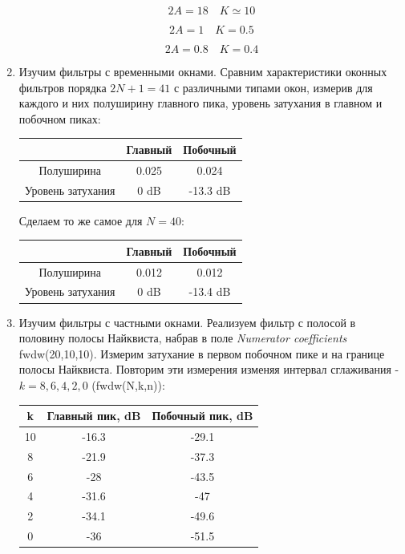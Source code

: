 \documentclass[a4paper, 12pt]{article}%
\begin{document}
\begin{enumerate}
\[2A = 18 \quad K \simeq 10\]

\[2A = 1 \quad K = 0.5\]

\[2A = 0.8 \quad K = 0.4\]

\item Изучим фильтры с временными окнами. Сравним характеристики оконных фильтров порядка $2N + 1 = 41$ с различными типами окон, измерив для каждого и них полуширину главного пика, уровень затухания в главном и побочном пиках:

\begin{center}
\begin{tabular}{|c|c|c|}
\hline 
 & Главный & Побочный \\ 
\hline 
Полуширина & 0.025 & 0.024 \\ 
\hline 
Уровень затухания & 0 dB & -13.3 dB \\ 
\hline 
\end{tabular} 
\end{center}

Сделаем то же самое для $N = 40$:

\begin{center}
\begin{tabular}{|c|c|c|}
\hline 
 & Главный & Побочный \\ 
\hline 
Полуширина & 0.012 & 0.012 \\ 
\hline 
Уровень затухания & 0 dB & -13.4 dB \\ 
\hline 
\end{tabular} 
\end{center}

\item Изучим фильтры с частными окнами. Реализуем фильтр с полосой в половину полосы Найквиста, набрав в поле \textit{Numerator coefficients} fwdw(20,10,10). Измерим затухание в первом побочном пике и на границе полосы Найквиста. Повторим эти измерения изменяя интервал сглаживания - $k = 8, 6, 4, 2, 0$ (fwdw(N,k,n)):

\begin{center}
\begin{tabular}{|c|c|c|}
\hline 
k & Главный пик, dB & Побочный пик, dB \\ 
\hline 
10 & -16.3 & -29.1 \\ 
\hline 
8 & -21.9 & -37.3 \\ 
\hline 
6 & -28 & -43.5 \\ 
\hline 
4 & -31.6 & -47 \\ 
\hline 
2 & -34.1 & -49.6 \\ 
\hline 
0 & -36 & -51.5 \\ 
\hline 
\end{tabular} 
\end{center}


\end{enumerate}
\end{document}
